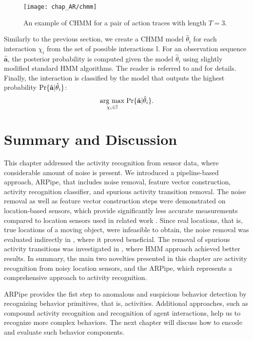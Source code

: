 \begin{figure}[!ht]
\centering
\texttt{[image: chap\_AR/chmm]}
\caption{An example of CHMM for a pair of action traces with length $T=3$.}
\label{fig:CHMMs}
\end{figure}

Similarly to the previous section, we create a CHMM model $\hat \theta_i$ for each interaction $\chi_i$ from the set of possible interactions $\mathbb{I}$. For an observation sequence $\hat{\mathbf{a}}$, the posterior probability is computed given the model $\hat \theta_i$ using slightly modified standard HMM algorithms. The reader is referred to \cite{Brand} and \cite{KollerFriedman2009} for details.
Finally, the interaction is classified by the model that outputs the highest probability $\text{Pr}\{\hat{\mathbf{a}}|\hat \theta_i\}$:
\begin{equation}
\label{eq:chmm-max}
\underset{\chi_i \in \mathbb{I}}{\operatorname{arg}\,\operatorname{max}}\; \text{Pr}\{\hat{\mathbf{a}}|\hat \theta_i\}.
\end{equation}


\section{Summary and Discussion}
This chapter addressed the activity recognition from sensor data, where considerable amount of noise is present. We introduced a pipeline-based approach, ARPipe, that includes noise removal, feature vector construction, activity recognition classifier, and spurious activity transition removal. The noise removal as well as feature vector construction steps were demonstrated on location-based sensors, which provide significantly less accurate measurements compared to location sensors used in related work \citep{Sukthankar2005, Qian2004}. Since real locations, that is, true locations of a moving object, were infeasible to obtain, the noise removal was evaluated indirectly in \citep{Kaluza2009Glajenje, Lustrek2009Behavior}, where it proved beneficial. The removal of spurious activity transitions was investigated in \citep{Kaluza09Reducing}, where HMM approach achieved better results. In summary, the main two novelties presented in this chapter are activity recognition from noisy location sensors, and the ARPipe, which represents a comprehensive approach to activity recognition.

ARPipe provides the fist step to anomalous and suspicious behavior detection by recognizing behavior primitives, that is, activities. Additional approaches, such as compound activity recognition and recognition of agent interactions, help us to recognize more complex behaviors. The next chapter will discuss how to encode and evaluate such behavior components.




